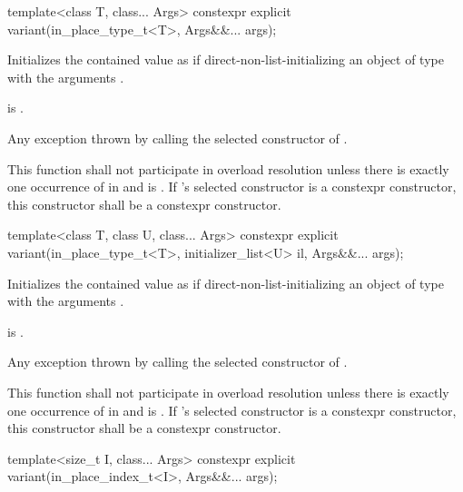 %
\begin{itemdecl}
template<class T, class... Args> constexpr explicit variant(in_place_type_t<T>, Args&&... args);
\end{itemdecl}

\begin{itemdescr}
\pnum
\effects
Initializes the contained value as if direct-non-list-initializing
an object of type 
with the arguments .

\pnum
\postconditions
{} is .

\pnum
\throws
Any exception thrown by calling the selected constructor of .

\pnum
\remarks
This function shall not participate in overload resolution unless there is
exactly one occurrence of  in  and
 is .
If 's selected constructor is a constexpr constructor, this
constructor shall be a constexpr constructor.
\end{itemdescr}

%
\begin{itemdecl}
template<class T, class U, class... Args>
  constexpr explicit variant(in_place_type_t<T>, initializer_list<U> il, Args&&... args);
\end{itemdecl}

\begin{itemdescr}
\pnum
\effects
Initializes the contained value as if direct-non-list-initializing
an object of type 
with the arguments .

\pnum
\postconditions
{} is .

\pnum
\throws
Any exception thrown by calling the selected constructor of .

\pnum
\remarks
This function shall not participate in overload resolution unless there is
exactly one occurrence of  in  and
 is .
If 's selected constructor is a constexpr constructor, this
constructor shall be a constexpr constructor.
\end{itemdescr}

%
\begin{itemdecl}
template<size_t I, class... Args> constexpr explicit variant(in_place_index_t<I>, Args&&... args);
\end{itemdecl}


